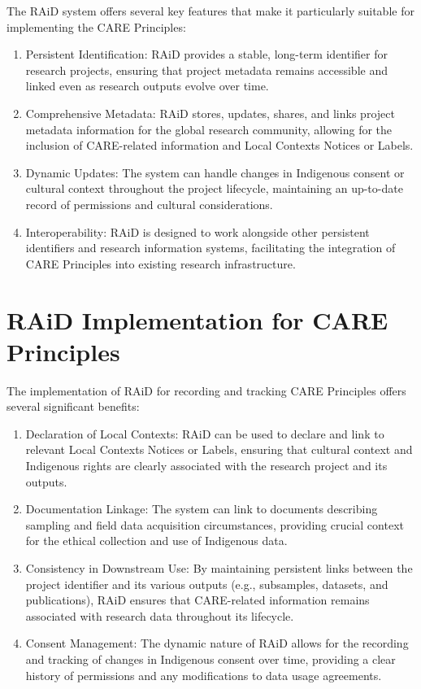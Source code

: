 \documentclass[a0,portrait]{a0poster}
\begin{document}
\begin{multicols}{2}
{The RAiD system offers several key features that make it particularly suitable for implementing the CARE Principles:

\begin{enumerate}
  \item Persistent Identification: RAiD provides a stable, long-term identifier for research projects, ensuring that project metadata remains accessible and linked even as research outputs evolve over time.
  \item Comprehensive Metadata: RAiD stores, updates, shares, and links project metadata information for the global research community, allowing for the inclusion of CARE-related information and Local Contexts Notices or Labels.
  \item Dynamic Updates: The system can handle changes in Indigenous consent or cultural context throughout the project lifecycle, maintaining an up-to-date record of permissions and cultural considerations.
  \item Interoperability: RAiD is designed to work alongside other persistent identifiers and research information systems, facilitating the integration of CARE Principles into existing research infrastructure.
\end{enumerate}

}

\color{ARDCPurple}
\section*{\LARGE RAiD Implementation for CARE Principles}
\color{DarkGrey}
\large{
The implementation of RAiD for recording and tracking CARE Principles offers several significant benefits:

\begin{enumerate}
  \item Declaration of Local Contexts: RAiD can be used to declare and link to relevant Local Contexts Notices or Labels, ensuring that cultural context and Indigenous rights are clearly associated with the research project and its outputs.
  \item Documentation Linkage: The system can link to documents describing sampling and field data acquisition circumstances, providing crucial context for the ethical collection and use of Indigenous data.
  \item Consistency in Downstream Use: By maintaining persistent links between the project identifier and its various outputs (e.g., subsamples, datasets, and publications), RAiD ensures that CARE-related information remains associated with research data throughout its lifecycle.
  \item Consent Management: The dynamic nature of RAiD allows for the recording and tracking of changes in Indigenous consent over time, providing a clear history of permissions and any modifications to data usage agreements.
\end{enumerate}

}
\end{multicols}
\end{document}
